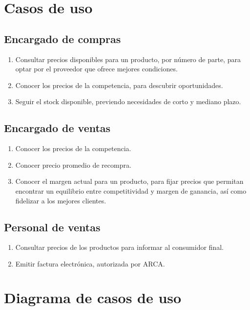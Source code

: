
\section{Casos de uso}

\subsection*{Encargado de compras}
\begin{enumerate}
	\item Consultar precios disponibles para un producto, 
	por número de parte, 
	para optar por el proveedor que ofrece mejores condiciones.
	\item Conocer los precios de la competencia,
	para descubrir oportunidades.
	\item Seguir el stock disponible,
	previendo necesidades de corto y mediano plazo.
\end{enumerate}

\subsection*{Encargado de ventas}
\begin{enumerate}
	\item Conocer los precios de la competencia.
	\item Conocer precio promedio de recompra.
	\item Conocer el margen actual para un producto,
	para fijar precios que permitan encontrar un equilibrio entre competitividad y margen de ganancia,
	así como fidelizar a los mejores clientes.
\end{enumerate}

\subsection*{Personal de ventas}
\begin{enumerate}
	\item Consultar precios de los productos para informar al consumidor final.
	\item Emitir factura electrónica,
	autorizada por ARCA.
\end{enumerate}

\section{Diagrama de casos de uso}

